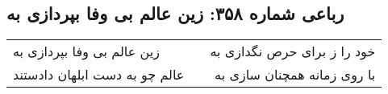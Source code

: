 \begin{center}
\section*{رباعی شماره ۳۵۸: زین عالم بی وفا بپردازی به}
\label{sec:sh358}
\begin{longtable}{l p{0.5cm} r}
زین عالم بی وفا بپردازی به
&&
خود را ز برای حرص نگدازی به
\\
عالم چو به دست ابلهان دادستند
&&
با روی زمانه همچنان سازی به
\\
\end{longtable}
\end{center}
